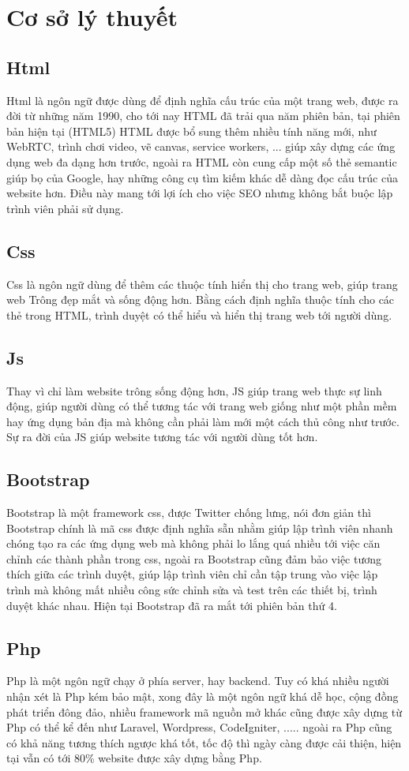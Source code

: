 \chapter{Cơ sở lý thuyết}
\section{Html}
Html là ngôn ngữ được dùng để định nghĩa cấu trúc của một trang web, được ra đời từ những năm 1990, cho tới nay HTML đã trải qua năm phiên bản, tại phiên bản hiện tại (HTML5) HTML được bổ sung thêm nhiều tính năng mới, như WebRTC, trình chơi video, vẽ canvas, service workers, ... giúp xây dựng các ứng dụng web đa dạng hơn trước, ngoài ra HTML còn cung cấp một số thẻ semantic giúp bọ của Google, hay những công cụ tìm kiếm khác dễ dàng đọc cấu trúc của website hơn. Điều này mang tới lợi ích cho việc SEO nhưng không bắt buộc lập trình viên phải sử dụng.
\section{Css}
Css là ngôn ngữ dùng để thêm các thuộc tính hiển thị cho trang web, giúp trang web Trông đẹp mắt và sống động hơn. Bằng cách định nghĩa thuộc tính cho các thẻ trong HTML, trình duyệt có thể hiểu và hiển thị trang web tới người dùng.
\section{Js}
Thay vì chỉ làm website trông sống động hơn, JS giúp trang web thực sự linh động, giúp người dùng có thể tương tác với trang web giống như một phần mềm hay ứng dụng bản địa mà không cần phải làm mới một cách thủ công như trước. Sự ra đời của JS giúp website tương tác với người dùng tốt hơn.
 \section{Bootstrap}
 Bootstrap là một framework css, được Twitter chống lưng, nói đơn giản thì Bootstrap chính là mã css được định nghĩa sẵn nhằm giúp lập trình viên nhanh chóng tạo ra các ứng dụng web mà không phải lo lắng quá nhiều tới việc căn chỉnh các thành phần trong css, ngoài ra Bootstrap cũng đảm bảo việc tương thích giữa các trình duyệt, giúp lập trình viên chỉ cần tập trung vào việc lập trình mà không mất nhiều công sức chỉnh sửa và test trên các thiết bị, trình duyệt khác nhau. Hiện tại Bootstrap đã ra mắt tới phiên bản thứ 4.
 \section{Php}
 Php là một ngôn ngữ chạy ở phía server, hay backend. Tuy có khá nhiều người nhận xét là Php kém bảo mật, xong đây là một ngôn ngữ khá dễ học, cộng đồng phát triển đông đảo, nhiều framework mã nguồn mở khác cũng được xây dựng từ Php có thể kể đến như Laravel, Wordpress, CodeIgniter, ..... ngoài ra Php cũng có khả năng tương thích ngược khá tốt, tốc độ thì ngày càng được cải thiện, hiện tại vẫn có tới 80\% website được xây dựng bằng Php.
